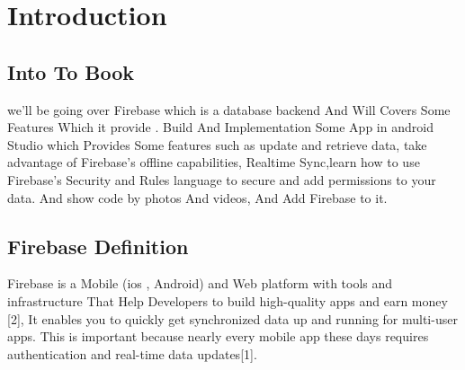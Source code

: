 \chapter{Introduction}

\section{Into To Book}
\subitem
{
	we’ll be going over Firebase which is a database backend And Will Covers Some Features Which it provide .
	Build And Implementation Some App in android Studio which Provides Some features such as update and retrieve data, take advantage of Firebase's offline capabilities, Realtime Sync,learn how to use Firebase’s Security and Rules language to secure and add permissions to your data.
    And show code by photos And videos, And Add Firebase to it.
	
	}


\section{Firebase Definition}
\subitem
{
	Firebase is a Mobile (ios , Android) and Web platform with tools and infrastructure  That Help Developers to build high-quality apps and earn money [2], It enables you to quickly get synchronized data up and running for multi-user apps. This is important because nearly every mobile app these days requires authentication and real-time data updates[1].               
	}
